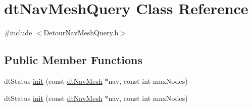 \hypertarget{classdtNavMeshQuery}{}\section{dt\+Nav\+Mesh\+Query Class Reference}
\label{classdtNavMeshQuery}


{\ttfamily \#include $<$Detour\+Nav\+Mesh\+Query.\+h$>$}

\subsection*{Public Member Functions}
\begin{DoxyCompactItemize}
\item 
dt\+Status \hyperlink{classdtNavMeshQuery_acb51d0d2798d0bc7c669ac38c25d4116}{init} (const \hyperlink{classdtNavMesh}{dt\+Nav\+Mesh} $\ast$nav, const int max\+Nodes)
\item 
dt\+Status \hyperlink{classdtNavMeshQuery_acb51d0d2798d0bc7c669ac38c25d4116}{init} (const \hyperlink{classdtNavMesh}{dt\+Nav\+Mesh} $\ast$nav, const int max\+Nodes)
\end{DoxyCompactItemize}

